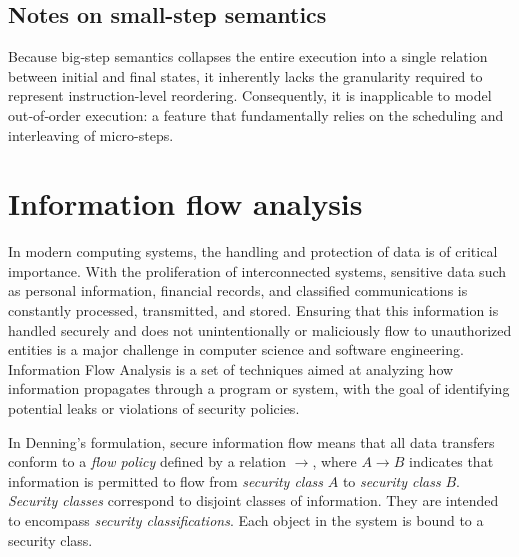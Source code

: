 \documentclass[12pt,a4paper,twoside]{book}
\begin{document}
\subsection{Notes on small-step semantics}
Because big‑step semantics collapses the entire execution into a single relation between initial and final states, it inherently lacks the granularity required to represent instruction-level reordering. Consequently, it is inapplicable to model out‑of‑order execution: a feature that fundamentally relies on the scheduling and interleaving of micro-steps.

\section{Information flow analysis}
In modern computing systems, the handling and protection of data is of critical importance\cite{iso27001_2022}. With the proliferation of interconnected systems, sensitive data such as personal information, financial records, and classified communications is constantly processed, transmitted, and stored\cite{zhang2022data}. Ensuring that this information is handled securely and does not unintentionally or maliciously flow to unauthorized entities is a major challenge in computer science and software engineering\cite{zhang2022data}. Information Flow Analysis\cite{denning1976lattice} is a set of techniques aimed at analyzing how information propagates through a program or system, with the goal of identifying potential leaks or violations of security policies.

In Denning's formulation\cite{denning1976lattice}, secure information flow means that all data transfers conform to a \textit{flow policy} defined by a relation \( \rightarrow \), where \( A \rightarrow B \) indicates that information is permitted to flow from \textit{security class} \( A \) to \textit{security class} \( B \).
\textit{Security classes} correspond to disjoint classes of information. They are intended to encompass \textit{security classifications}. Each object in the system is bound to a security class.
\end{document}
